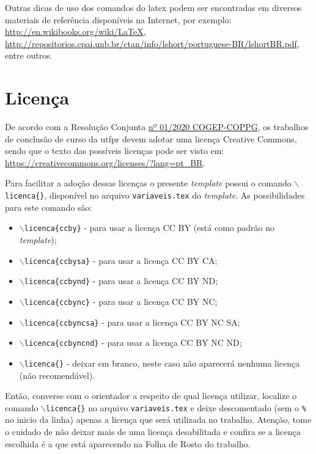 Outras dicas de uso dos comandos do \gls{latex} podem ser encontradas em diversos materiais de referência disponíveis na Internet, por exemplo: \url{http://en.wikibooks.org/wiki/LaTeX}, \url{http://repositorios.cpai.unb.br/ctan/info/lshort/portuguese-BR/lshortBR.pdf}, entre outros.

\section{Licença}\label{sec:licenca}

De acordo com a Resolução Conjunta \href{https://sei.utfpr.edu.br/sei/publicacoes/controlador_publicacoes.php?acao=publicacao_visualizar&id_documento=1811618&id_orgao_publicacao=0}{nº 01/2020 COGEP-COPPG}, os trabalhos de conclusão de curso da \gls{utfpr} devem adotar uma licença Creative Commons, sendo que o texto das possíveis licenças pode ser visto em: \url{https://creativecommons.org/licenses/?lang=pt_BR}.

Para facilitar a adoção dessas licenças o presente \textit{template} possui o comando \texttt{$\backslash$licenca\{\}}, disponível no arquivo \texttt{variaveis.tex} do \textit{template}. As possibilidades para este comando são:

\begin{itemize}
    \item \texttt{$\backslash$licenca\{ccby\}} - para usar a licença CC BY (está como padrão no \textit{template});
    \item \texttt{$\backslash$licenca\{ccbysa\}} - para usar a licença CC BY CA;
    \item \texttt{$\backslash$licenca\{ccbynd\}} - para usar a licença CC BY ND;
    \item \texttt{$\backslash$licenca\{ccbync\}} - para usar a licença CC BY NC;
    \item \texttt{$\backslash$licenca\{ccbyncsa\}} - para usar a licença CC BY NC SA;
    \item \texttt{$\backslash$licenca\{ccbyncnd\}} - para usar a licença CC BY NC ND;
    \item \texttt{$\backslash$licenca\{\}} - deixar em branco, neste caso não aparecerá nenhuma licença (não recomendável).
\end{itemize}

Então, converse com o orientador a respeito de qual licença utilizar, localize o comando \texttt{$\backslash$licenca\{\}} no arquivo \texttt{variaveis.tex} e deixe descomentado (sem o \texttt{\%} no inicio da linha) apenas a licença que será utilizada no trabalho. Atenção, tome o cuidado de não deixar mais de uma licença desabilitada e confira se a licença escolhida é a que está aparecendo na Folha de Rosto do trabalho.